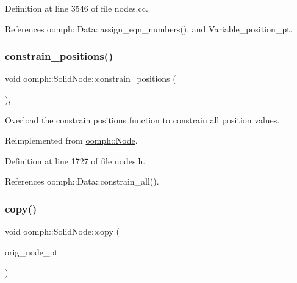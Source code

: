 Definition at line 3546 of file nodes.\+cc.



References oomph\+::\+Data\+::assign\+\_\+eqn\+\_\+numbers(), and Variable\+\_\+position\+\_\+pt.

\mbox{\label{classoomph_1_1SolidNode_a08b51c4154b8c399fa021d948ad36b98}} 
\subsubsection{\texorpdfstring{constrain\+\_\+positions()}{constrain\_positions()}}
{\footnotesize\ttfamily void oomph\+::\+Solid\+Node\+::constrain\+\_\+positions (\begin{DoxyParamCaption}{ }\end{DoxyParamCaption})\hspace{0.3cm}{\ttfamily [inline]}, {\ttfamily [virtual]}}



Overload the constrain positions function to constrain all position values. 



Reimplemented from \hyperlink{classoomph_1_1Node_a8758650a2e6d7312ad070bb8ce327c4b}{oomph\+::\+Node}.



Definition at line 1727 of file nodes.\+h.



References oomph\+::\+Data\+::constrain\+\_\+all().

\mbox{\label{classoomph_1_1SolidNode_ae4dfa5355b84b58745b0c6a3fef60112}} 
\subsubsection{\texorpdfstring{copy()}{copy()}}
{\footnotesize\ttfamily void oomph\+::\+Solid\+Node\+::copy (\begin{DoxyParamCaption}\item[{\hyperlink{classoomph_1_1SolidNode}{Solid\+Node} $\ast$}]{orig\+\_\+node\+\_\+pt }\end{DoxyParamCaption})}



